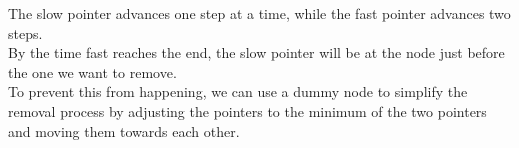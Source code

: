 \documentclass[preview]{standalone}
\begin{document}
The slow pointer advances one step at a time, while the fast pointer advances two steps.\\By the time fast reaches the end, the slow pointer will be at the node just before the one we want to remove.\\To prevent this from happening, we can use a dummy node to simplify the removal process by adjusting the pointers to the minimum of the two pointers and moving them towards each other.\\
\end{document}
